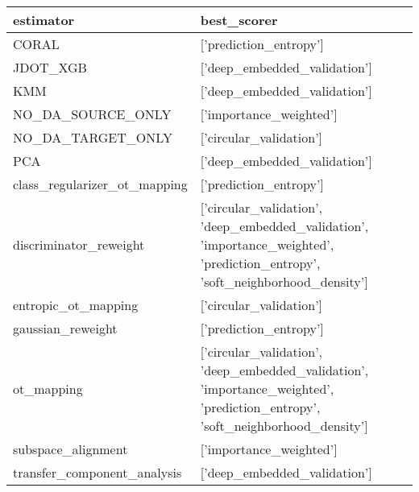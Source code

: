 \begin{tabular}{ll}
\hline
 estimator                    & best\_scorer                                                                                                                   \\
\hline
 CORAL                        & ['prediction\_entropy']                                                                                                        \\
 JDOT\_XGB                     & ['deep\_embedded\_validation']                                                                                                  \\
 KMM                          & ['deep\_embedded\_validation']                                                                                                  \\
 NO\_DA\_SOURCE\_ONLY            & ['importance\_weighted']                                                                                                       \\
 NO\_DA\_TARGET\_ONLY            & ['circular\_validation']                                                                                                       \\
 PCA                          & ['deep\_embedded\_validation']                                                                                                  \\
 class\_regularizer\_ot\_mapping & ['prediction\_entropy']                                                                                                        \\
 discriminator\_reweight       & ['circular\_validation', 'deep\_embedded\_validation', 'importance\_weighted', 'prediction\_entropy', 'soft\_neighborhood\_density'] \\
 entropic\_ot\_mapping          & ['circular\_validation']                                                                                                       \\
 gaussian\_reweight            & ['prediction\_entropy']                                                                                                        \\
 ot\_mapping                   & ['circular\_validation', 'deep\_embedded\_validation', 'importance\_weighted', 'prediction\_entropy', 'soft\_neighborhood\_density'] \\
 subspace\_alignment           & ['importance\_weighted']                                                                                                       \\
 transfer\_component\_analysis  & ['deep\_embedded\_validation']                                                                                                  \\
\hline
\end{tabular}